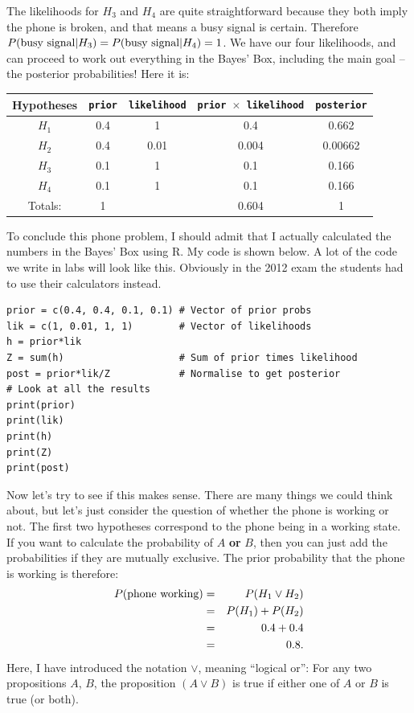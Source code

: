 The likelihoods for $H_3$ and $H_4$ are quite straightforward
because they both imply the phone is broken, and that means a busy signal is certain.
Therefore $P(\textnormal{busy signal} | H_3) = P(\textnormal{busy signal} | H_4) = 1$.
We have our four likelihoods, and can proceed to work out everything in the
Bayes' Box, including the main goal -- the posterior probabilities! Here it is:
\begin{table}[!ht]
\begin{center}
\begin{tabular}{|c|c|c|c|c|}
\hline
{\bf Hypotheses} & {\tt prior} & {\tt likelihood} &
{\tt prior $\times$ likelihood} & {\tt posterior}\\
\hline
$H_1$ & 0.4 & 1 &  0.4 & 0.662\\
$H_2$ & 0.4 & 0.01 & 0.004 & 0.00662\\
$H_3$ & 0.1 & 1 & 0.1 & 0.166\\
$H_4$ & 0.1 & 1 & 0.1 & 0.166\\
\hline
Totals: & 1 & & 0.604 & 1\\
\hline
\end{tabular}
\end{center}
\end{table}

To conclude this phone problem, I should admit that
I actually calculated the numbers in the Bayes' Box using R. My code is shown
below. A lot of the code we write in labs will look like this. Obviously in the
2012 exam the students had to use their calculators instead.
\begin{verbatim}
prior = c(0.4, 0.4, 0.1, 0.1) # Vector of prior probs
lik = c(1, 0.01, 1, 1)        # Vector of likelihoods
h = prior*lik
Z = sum(h)                    # Sum of prior times likelihood
post = prior*lik/Z            # Normalise to get posterior
# Look at all the results
print(prior)
print(lik)
print(h)
print(Z)
print(post)
\end{verbatim}

Now let's try to see if this makes sense. There are many things we could think
about, but let's just consider the question of whether
the phone is working or not. The first two hypotheses correspond to the phone
being in a working state. If you want to calculate the probability of $A$
{\bf or} $B$, then you can just add the probabilities if they are mutually
exclusive. The prior probability that the phone is working is
therefore:
\begin{eqnarray}
P(\textnormal{phone working}) &=& P(H_1 \vee H_2)\\
&=& P(H_1) + P(H_2)\\
&=& 0.4 + 0.4\\
&=& 0.8.
\end{eqnarray}
Here, I have introduced the notation $\vee$, meaning ``logical or'': For
any two propositions $A$, $B$, the proposition $(A \vee B)$ is true if
either one of $A$ or $B$ is true (or both).

